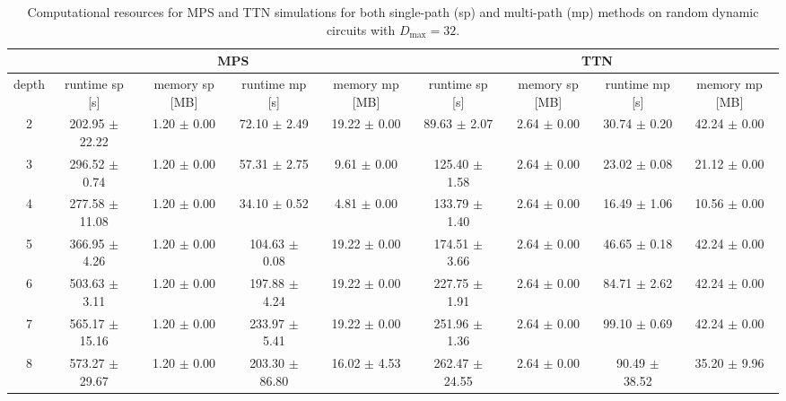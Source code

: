 \begin{table}[t!]
\centering
\scriptsize
\begin{tabular}{c|cccc|cccc}
\hline
 & \multicolumn{4}{c|}{MPS} & \multicolumn{4}{c}{TTN} \\
\hline
depth & runtime sp [s] & memory sp [MB] & runtime mp [s] & memory mp [MB] & runtime sp [s] & memory sp [MB] & runtime mp [s] & memory mp [MB] \\
\hline
2 & 202.95 $\pm$ 22.22 & 1.20 $\pm$ 0.00 & 72.10 $\pm$ 2.49 & 19.22 $\pm$ 0.00 & 89.63 $\pm$ 2.07 & 2.64 $\pm$ 0.00 & 30.74 $\pm$ 0.20 & 42.24 $\pm$ 0.00 \\
3 & 296.52 $\pm$ 0.74 & 1.20 $\pm$ 0.00 & 57.31 $\pm$ 2.75 & 9.61 $\pm$ 0.00 & 125.40 $\pm$ 1.58 & 2.64 $\pm$ 0.00 & 23.02 $\pm$ 0.08 & 21.12 $\pm$ 0.00 \\
4 & 277.58 $\pm$ 11.08 & 1.20 $\pm$ 0.00 & 34.10 $\pm$ 0.52 & 4.81 $\pm$ 0.00 & 133.79 $\pm$ 1.40 & 2.64 $\pm$ 0.00 & 16.49 $\pm$ 1.06 & 10.56 $\pm$ 0.00 \\
5 & 366.95 $\pm$ 4.26 & 1.20 $\pm$ 0.00 & 104.63 $\pm$ 0.08 & 19.22 $\pm$ 0.00 & 174.51 $\pm$ 3.66 & 2.64 $\pm$ 0.00 & 46.65 $\pm$ 0.18 & 42.24 $\pm$ 0.00 \\
6 & 503.63 $\pm$ 3.11 & 1.20 $\pm$ 0.00 & 197.88 $\pm$ 4.24 & 19.22 $\pm$ 0.00 & 227.75 $\pm$ 1.91 & 2.64 $\pm$ 0.00 & 84.71 $\pm$ 2.62 & 42.24 $\pm$ 0.00 \\
7 & 565.17 $\pm$ 15.16 & 1.20 $\pm$ 0.00 & 233.97 $\pm$ 5.41 & 19.22 $\pm$ 0.00 & 251.96 $\pm$ 1.36 & 2.64 $\pm$ 0.00 & 99.10 $\pm$ 0.69 & 42.24 $\pm$ 0.00 \\
8 & 573.27 $\pm$ 29.67 & 1.20 $\pm$ 0.00 & 203.30 $\pm$ 86.80 & 16.02 $\pm$ 4.53 & 262.47 $\pm$ 24.55 & 2.64 $\pm$ 0.00 & 90.49 $\pm$ 38.52 & 35.20 $\pm$ 9.96 \\
\hline
\end{tabular}
\caption{Computational resources for MPS and TTN simulations for both single-path (sp) and multi-path (mp) methods on random dynamic circuits with $D_{\max}=32$.}
\label{tab:dynamic-scaling-combined-dmax-32}
\end{table}